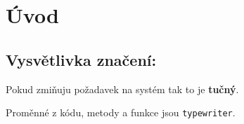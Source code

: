 \chapter*{Úvod}\label{chap:uvod}

\section*{Vysvětlivka značení:}

Pokud zmiňuju požadavek na systém tak to je \textbf{tučný}.

Proměnné z kódu, metody a funkce jsou \texttt{typewriter}.
